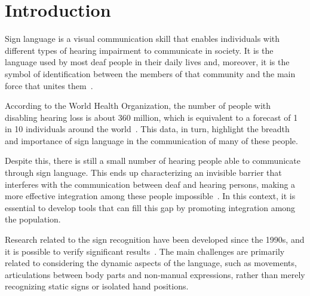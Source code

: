 \section{Introduction} 
\label{sec:introduction}

Sign language is a visual communication skill that enables individuals with different types of hearing impairment to communicate in society. It is the language used by most deaf people in their daily lives and, moreover, it is the symbol of identification between the members of that community and the main force that unites them~\cite{pereira-choi-2011}. %

According to the World Health Organization, the number of people with disabling hearing loss is about 360 million, which is equivalent to a forecast of 1 in 10 individuals around the world~\cite{who-2018}. This data, in turn, highlight the breadth and importance of sign language in the communication of many of these people.

Despite this, there is still a small number of hearing people able to communicate through sign language. This ends up characterizing an invisible barrier that interferes with the communication between deaf and hearing persons, making a more effective integration among these people impossible~\cite{peres-2006}. In this context, it is essential to develop tools that can fill this gap by promoting integration among the population.

Research related to the sign recognition have been developed since the 1990s, and it is possible to verify significant results~\cite{lim-2016,recent-advances-dl-2017}. The main challenges are primarily related to considering the dynamic aspects of the language, such as movements, articulations between body parts and non-manual expressions, rather than merely recognizing static signs or isolated hand positions. %

